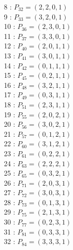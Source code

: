 \documentclass{article}
\begin{document}
{\begin{multicols}{3}
8 : $P_{32}=( 2, 2, 0, 1 )$\\
9 : $P_{33}=( 3, 2, 0, 1 )$\\
10 : $P_{36}=( 2, 3, 0, 1 )$\\
11 : $P_{37}=( 3, 3, 0, 1 )$\\
12 : $P_{40}=( 2, 0, 1, 1 )$\\
13 : $P_{41}=( 3, 0, 1, 1 )$\\
14 : $P_{42}=( 0, 1, 1, 1 )$\\
15 : $P_{45}=( 0, 2, 1, 1 )$\\
16 : $P_{48}=( 3, 2, 1, 1 )$\\
17 : $P_{49}=( 0, 3, 1, 1 )$\\
18 : $P_{51}=( 2, 3, 1, 1 )$\\
19 : $P_{55}=( 2, 0, 2, 1 )$\\
20 : $P_{56}=( 3, 0, 2, 1 )$\\
21 : $P_{57}=( 0, 1, 2, 1 )$\\
22 : $P_{60}=( 3, 1, 2, 1 )$\\
23 : $P_{61}=( 0, 2, 2, 1 )$\\
24 : $P_{63}=( 2, 2, 2, 1 )$\\
25 : $P_{65}=( 0, 3, 2, 1 )$\\
26 : $P_{71}=( 2, 0, 3, 1 )$\\
27 : $P_{72}=( 3, 0, 3, 1 )$\\
28 : $P_{73}=( 0, 1, 3, 1 )$\\
29 : $P_{75}=( 2, 1, 3, 1 )$\\
30 : $P_{77}=( 0, 2, 3, 1 )$\\
31 : $P_{81}=( 0, 3, 3, 1 )$\\
32 : $P_{84}=( 3, 3, 3, 1 )$\\
\end{multicols}


%


%


}%
\end{document}
